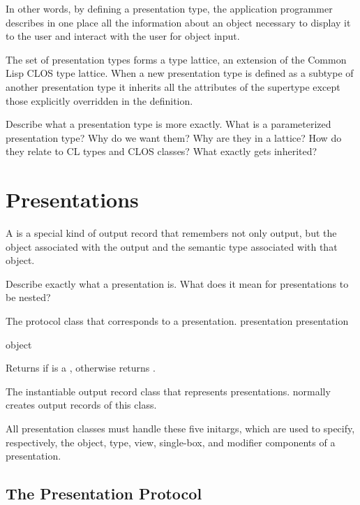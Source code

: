In other words, by defining a presentation type, the application programmer
describes in one place all the information about an object necessary to display
it to the user and interact with the user for object input.

The set of presentation types forms a type lattice, an extension of the Common
Lisp CLOS type lattice.  When a new presentation type is defined as a subtype of
another presentation type it inherits all the attributes of the supertype except
those explicitly overridden in the definition.

 {Describe what a presentation type is more exactly.  What is a
parameterized presentation type?  Why do we want them?  Why are they in a
lattice?  How do they relate to CL types and CLOS classes?  What exactly gets
inherited?}


\section {Presentations}

A  is a special kind of output record that remembers not
only output, but the object associated with the output and the semantic type
associated with that object.

 {Describe exactly what a presentation is.  What does it mean for
presentations to be nested?}


The protocol class that corresponds to a presentation.
 {presentation} {presentation}

 {object}

Returns  if  is a , otherwise returns
.


The instantiable output record class that represents presentations.
 normally creates output records of this class.
\Mutable


All presentation classes must handle these five initargs, which are used to
specify, respectively, the object, type, view, single-box, and modifier
components of a presentation.


\subsection {The Presentation Protocol}

